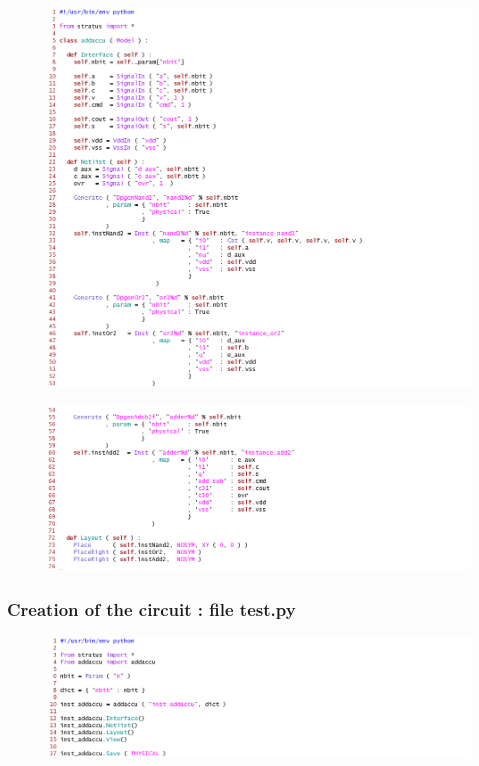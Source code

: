 \begin{figure}[h!]
\centering
\includegraphics[width=1.4\textwidth]{./images/addaccu1.png}
\end{figure}

\begin{figure}[h!]
\centering
\includegraphics[width=1.4\textwidth]{./images/addaccu2.png}
\end{figure}

\newpage
\subsubsection{Creation of the circuit : file test.py}

\begin{figure}[h!]
\centering
\includegraphics[width=1.4\textwidth]{./images/test.png}
\end{figure}


